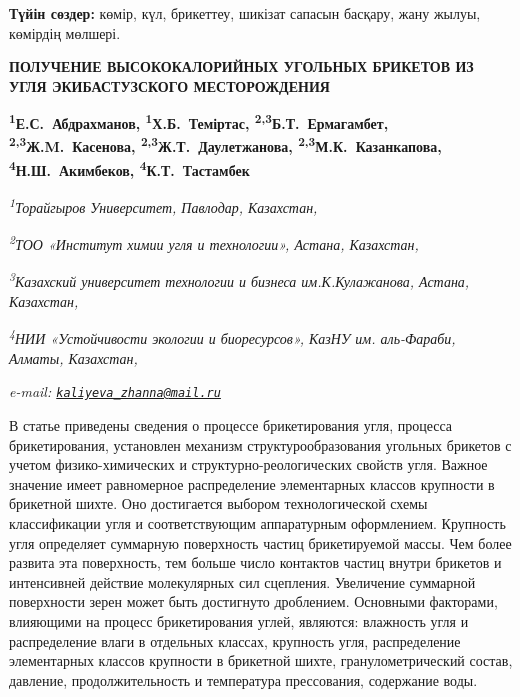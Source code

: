{\bfseries Түйін сөздер:} көмір, күл, брикеттеу, шикізат сапасын басқару,
жану жылуы, көмірдің мөлшері.

\begin{articleheader}
{\bfseries ПОЛУЧЕНИЕ ВЫСОКОКАЛОРИЙНЫХ УГОЛЬНЫХ БРИКЕТОВ ИЗ УГЛЯ ЭКИБАСТУЗСКОГО МЕСТОРОЖДЕНИЯ}

{\bfseries
\textsuperscript{1}Е.С.~Абдрахманов,
\textsuperscript{1}Х.Б.~Теміртас,
\textsuperscript{2,3}Б.Т.~Ермагамбет,
\textsuperscript{2,3}Ж.M.~Касенова,
\textsuperscript{2,3}Ж.Т.~Даулетжанова\textsuperscript{\envelope },
\textsuperscript{2,3}М.К.~Казанкапова,
\textsuperscript{4}Н.Ш.~Акимбеков,
\textsuperscript{4}К.Т.~Тастамбек}
\end{articleheader}

\begin{affiliation}
\emph{\textsuperscript{1}Торайгыров Университет, Павлодар, Казахстан,}

\emph{\textsuperscript{2}ТОО «Институт химии угля и технологии», Астана, Казахстан,}

\emph{\textsuperscript{3}Казахский университет технологии и бизнеса им.К.Кулажанова, Астана, Казахстан,}

\emph{\textsuperscript{4}НИИ «Устойчивости экологии и биоресурсов», КазНУ им. аль-Фараби, Алматы, Казахстан,}

\emph{e-mail: \href{mailto:kaliyeva_zhanna@mail.ru}{\nolinkurl{kaliyeva\_zhanna@mail.ru}}}
\end{affiliation}

В статье приведены сведения о процессе брикетирования угля, процесса
брикетирования, установлен механизм структурообразования угольных
брикетов с учетом физико-химических и структурно-реологических свойств
угля. Важное значение имеет равномерное распределение элементарных
классов крупности в брикетной шихте. Оно достигается выбором
технологической схемы классификации угля и соответствующим аппаратурным
оформлением. Крупность угля определяет суммарную поверхность частиц
брикетируемой массы. Чем более развита эта поверхность, тем больше число
контактов частиц внутри брикетов и интенсивней действие молекулярных сил
сцепления. Увеличение суммарной поверхности зерен может быть достигнуто
дроблением. Основными факторами, влияющими на процесс брикетирования
углей, являются: влажность угля и распределение влаги в отдельных
классах, крупность угля, распределение элементарных классов крупности в
брикетной шихте, гранулометрический состав, давление, продолжительность
и температура прессования, содержание воды.

